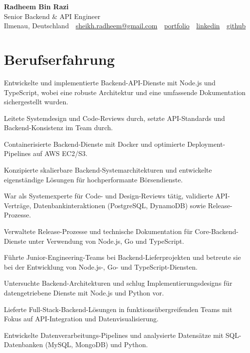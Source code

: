 \documentclass[11pt,a4paper]{resume}
\makeatletter
\newcommand{\Portfolio}{https://radheem.github.io/my-cv}
\newcommand{\PortfolioText}{portfolio}
\newcommand{\GitHub}{https://github.com/radheem}
\newcommand{\LinkedIn}{https://www.linkedin.com/in/radheem-razi}
\newcommand{\Email}{sheikh.radheem@gmail.com}
\makeatother
\begin{document}
\clearpage
{}

\begin{center}
  {\huge\bfseries Radheem Bin Razi}\\[3pt]
  {\large Senior Backend \& API Engineer}\\[6pt]
  \small
  Ilmenau, Deutschland \,\textbar\,
  \href{mailto:\Email}{\Email} \,\textbar\,
  \href{\Portfolio}{\PortfolioText} \,\textbar\,
  \href{\LinkedIn}{linkedin} \,\textbar\,
  \href{\GitHub}{github}
\end{center}
\vspace{2pt}

\section{Berufserfahrung}

\bullets
  \item Entwickelte und implementierte Backend-API-Dienste mit Node.js und TypeScript, wobei eine robuste Architektur und eine umfassende Dokumentation sichergestellt wurden.
  \item Leitete Systemdesign und Code-Reviews durch, setzte API-Standards und Backend-Konsistenz im Team durch.
  \item Containerisierte Backend-Dienste mit Docker und optimierte Deployment-Pipelines auf AWS EC2/S3.
\bulletsend
\vspace{3pt}
\bullets
  \item Konzipierte skalierbare Backend-Systemarchitekturen und entwickelte eigenständige Lösungen für hochperformante Börsendienste.
  \item War als Systemexperte für Code- und Design-Reviews tätig, validierte API-Verträge, Datenbankinteraktionen (PostgreSQL, DynamoDB) sowie Release-Prozesse.
  \item Verwaltete Release-Prozesse und technische Dokumentation für Core-Backend-Dienste unter Verwendung von Node.js, Go und TypeScript.
  \item Führte Junior-Engineering-Teams bei Backend-Lieferprojekten und betreute sie bei der Entwicklung von Node.js-, Go- und TypeScript-Diensten.
\bulletsend
\vspace{3pt}
\bullets
  \item Untersuchte Backend-Architekturen und schlug Implementierungsdesigns für datengetriebene Dienste mit Node.js und Python vor.
  \item Lieferte Full-Stack-Backend-Lösungen in funktionsübergreifenden Teams mit Fokus auf API-Integration und Datenvisualisierung.
  \item Entwickelte Datenverarbeitungs-Pipelines und analysierte Datensätze mit SQL-Datenbanken (MySQL, MongoDB) und Python.
\bulletsend
\vspace{3pt}
\end{document}
